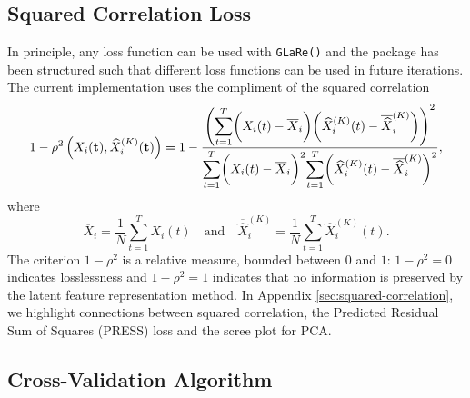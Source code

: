 \subsection{Squared Correlation Loss}

In principle, any loss function can be used with \texttt{GLaRe()} and the package has been structured such that different loss functions can be used in future iterations.
The current implementation uses the compliment of the squared correlation
$$
1- \rho^2 \left(X_i (\mathbf{t}), \widehat{X}^{(K)}_{i} (\mathbf{t}) \right) =
1 - \frac{\left( \mathlarger{\sum}_{t = 1}^T{\bigg(X_i (t) - \overline{X}_i \bigg) \bigg( \widehat{X}_i^{(K)} (t) - \overline{\widehat{X}}_i^{(K)} \bigg)} \right)^2}{\mathlarger{\sum}_{t = 1}^T \bigg(X_i (t) - \overline{X}_i \bigg)^2 \mathlarger{\sum}_{t = 1}^T \bigg( \widehat{X}_i^{(K)} (t) - \overline{\widehat{X}}_i^{(K)} \bigg) ^2},
$$
where
$$
\overline{X}_i = \frac{1}{N} \sum_{t=1}^T X_i (t) \quad \text{and} \quad \overline{\widehat{X}}_i^{(K)} = \frac{1}{N} \sum_{t=1}^T \widehat{X}_i^{(K)} (t).
$$
The criterion $1- \rho^2$ is a relative measure, bounded between $0$ and $1$: $1- \rho^2 = 0$ indicates losslessness and $1- \rho^2 = 1$ indicates that no information is preserved by the latent feature representation method.
In Appendix \ref{sec:squared-correlation}, we highlight connections between squared correlation, the Predicted Residual Sum of Squares (PRESS) loss and the scree plot for PCA.

\subsection{Cross-Validation Algorithm}


